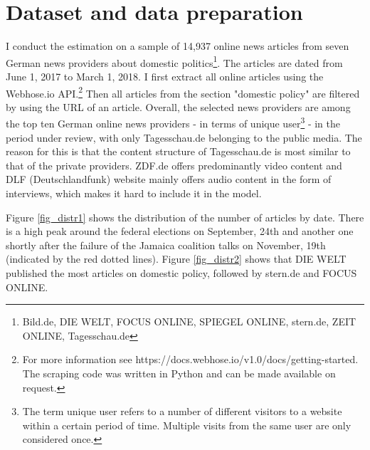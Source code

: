 \documentclass[12pt,a4paper,notitlepage]{article}
\begin{document}
\section{Dataset and data preparation}\label{ch_data}




I conduct the estimation on a sample of 14,937 online news articles from seven German news providers about domestic politics\footnote{Bild.de, DIE WELT, FOCUS ONLINE, SPIEGEL ONLINE, stern.de, ZEIT ONLINE, Tagesschau.de}. The articles are dated from June 1, 2017 to March 1, 2018. I first extract all online articles using the Webhose.io API.\footnote{For more information see https://docs.webhose.io/v1.0/docs/getting-started. The scraping code was written in Python and can be made available on request.} Then all articles from the section "domestic policy" are filtered by using the URL of an article. Overall, the selected news providers are among the top ten German online news providers - in terms of unique user\footnote{The term unique user refers to a number of different visitors to a website within a certain period of time. Multiple visits from the same user are only considered once.} - in the period under review, with only Tagesschau.de belonging to the public media. The reason for this is that the content structure of Tagesschau.de is most similar to that of the private providers. ZDF.de offers predominantly video content and DLF (Deutschlandfunk) website mainly offers audio content in the form of interviews, which makes it hard to include it in the model. 

 Figure \ref{fig_distr1} shows the distribution of the number of articles by date. There is a high peak around the federal elections on September, 24th and another one shortly after the failure of the Jamaica coalition talks on November, 19th (indicated by the red dotted lines). Figure \ref{fig_distr2} shows that DIE WELT published the most articles on domestic policy, followed by stern.de and FOCUS ONLINE.  
\end{document}
